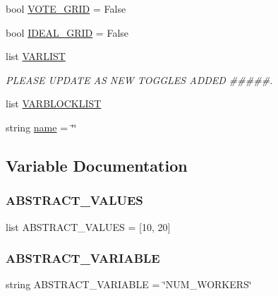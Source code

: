 \begin{DoxyCompactItemize}
\item 
bool \mbox{\hyperlink{namespacereorder_abd2acb6c03d6ca650537592475fc69e4}{V\+O\+T\+E\+\_\+\+G\+R\+ID}} = False
\item 
bool \mbox{\hyperlink{namespacereorder_a42311c82a77ac3b1c03bf7b9c6619be2}{I\+D\+E\+A\+L\+\_\+\+G\+R\+ID}} = False
\item 
list \mbox{\hyperlink{namespacereorder_abad4087652ccca08b33c499c7aad17b0}{V\+A\+R\+L\+I\+ST}}
\begin{DoxyCompactList}\small\item\em P\+L\+E\+A\+SE U\+P\+D\+A\+TE AS N\+EW T\+O\+G\+G\+L\+ES A\+D\+D\+ED \#\#\#\#\#. \end{DoxyCompactList}\item 
list \mbox{\hyperlink{namespacereorder_aa02a2d2c1773074f98b23ad1078b99da}{V\+A\+R\+B\+L\+O\+C\+K\+L\+I\+ST}}
\item 
string \mbox{\hyperlink{namespacereorder_a8ccf841cb59e451791bcb2e1ac4f1edc}{name}} = \char`\"{}\char`\"{}
\end{DoxyCompactItemize}


\subsection{Variable Documentation}
\mbox{\label{namespacereorder_ab64c8432c11e4b89425ac1f220ca01a9}} 
\subsubsection{\texorpdfstring{ABSTRACT\_VALUES}{ABSTRACT\_VALUES}}
{\footnotesize\ttfamily list A\+B\+S\+T\+R\+A\+C\+T\+\_\+\+V\+A\+L\+U\+ES = \mbox{[}10, 20\mbox{]}}

\mbox{\label{namespacereorder_a05ba5c39ee5a05284597d091b01650a3}} 
\subsubsection{\texorpdfstring{ABSTRACT\_VARIABLE}{ABSTRACT\_VARIABLE}}
{\footnotesize\ttfamily string A\+B\+S\+T\+R\+A\+C\+T\+\_\+\+V\+A\+R\+I\+A\+B\+LE = \char`\"{}N\+U\+M\+\_\+\+W\+O\+R\+K\+E\+RS\char`\"{}}


